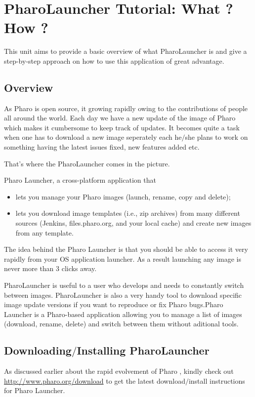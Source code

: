 \documentclass[a4paper,10pt,twoside]{book}
\begin{document}
\fi
\sloppy

\chapter{ PharoLauncher Tutorial: What ? How ?}
This unit aims to provide a basic overview of what PharoLauncher is and give a step-by-step approach on how to use this application of great advantage. 
\section{Overview}
 

As Pharo is open source, it growing rapidly owing to the contributions of people all around the world. Each day we have a new update of the image of Pharo which makes it cumbersome to keep track of updates. It becomes quite a task when one has to download a new image seperately each he$/$she plans to work on something having the latest issues fixed, new features added etc.

That's where the PharoLauncher comes in the picture.

Pharo Launcher, a cross-platform application that 

\begin{itemize}
\item  lets you manage your Pharo images (launch, rename, copy and delete); 
\item  lets you download image templates (i.e., zip archives) from many  different sources (Jenkins, files.pharo.org, and your local cache) and create new images from any template.
\end{itemize}

The idea behind the Pharo Launcher is that you should be able to access it very rapidly from your OS application launcher. As a result launching any image is never more than 3 clicks away. 

PharoLauncher is useful to a user who develops and needs to constantly switch between images. PharoLauncher is also a very handy tool to download specific image update versions if you want to reproduce or fix Pharo bugs.Pharo Launcher is a Pharo-based application allowing you to manage a list of images (download, rename, delete) and switch between them without aditional tools. 
\section{ Downloading$/$Installing PharoLauncher}
As discussed earlier about the rapid evolvement of Pharo , kindly check out \url{http://www.pharo.org/download} to get the latest download$/$install instructions for Pharo Launcher.
\end{document}
